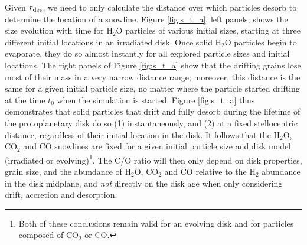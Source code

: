 \documentclass[apj]{emulateapj}
\newcommand{\emgr}[1]{\emph{ \color{gray} #1}}
\begin{document}
Given $r_{\rm des}$, we need to only calculate the distance over which particles desorb to determine the location of a snowline. Figure \ref{fig:s_t_a}, left panels, shows the size evolution with time for H$_2$O particles of various initial sizes, starting at three different initial locations in an irradiated disk. Once solid H$_2$O particles begin to evaporate, they do so almost instantly for all explored particle sizes and initial locations. %
The right panels of Figure \ref{fig:s_t_a} show that the drifting grains lose most of their mass in a very narrow distance range; moreover, this distance is the same for a given initial particle size, no matter where the particle started drifting at the time $t_0$ when the simulation is started. Figure \ref{fig:s_t_a} thus demonstrates that solid particles that drift and fully desorb during the lifetime of the protoplanetary disk do so (1) instantaneously, and (2) at a fixed stellocentric distance, regardless of their initial location in the disk. 
It follows that the H$_2$O, CO$_2$ and CO snowlines are fixed for a given initial particle size and disk model (irradiated or evolving)\footnote{Both of these conclusions remain valid for an evolving disk and for particles composed of CO$_2$ or CO.}. The C/O ratio will then only depend on disk properties, grain size, and the abundance of H$_2$O, CO$_2$ and CO relative to the H$_2$ abundance in the disk midplane, and {\it not} directly on the disk age when only considering drift, accretion and desorption.  %




\end{document}
